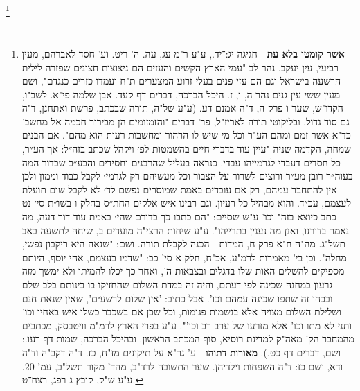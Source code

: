 \begin{multicols}{2}
\footnote{ \textbf{אשר קומטו בלא עת} - חגיגה יג:־יד., ע"ע ר"מ עג, עה. ה' ריט. וע' חסד לאברהם, מעין רביעי, עין יעקב, נהר לב "עמי הארץ הקשים והעזים הם ניצוצות חצונים שפזרה לילית הרשעה בישראל וגם הם עזי פנים בעלי זרוע המצערים ת"ח ועמדו כזרים כנגדם", ושם מעין ששי עין גנים נהר ה, ו, ז. היכל הברכה, דברים דף קעד. אבן שלמה פי"א. לשב"ו, הקדו"ש, שער ו פרק ה, ד"ה אמנם דע. \newline
(ע"ע של"ה, תורה שבכתב, פרשת ואתחנן, ד"ה גם סוד גדול. ובליקוטי תורה לאריז"ל, פר' דברים "והזמזומים הן מבירור חכמה אל מחשב' כד"א אשר זמם ומהם הע"ר וכל מי שיש לו הרהור ומחשבות רעות הוא מהם". אם הבנים שמחה, הקדמה שניה "עיין עוד בדברי חיים בהשמטות לפ׳ ויקהל שכתב בזה״ל: אך הע״ר, כל חסדים דעבדי לגרמייהו עבדי. כנראה בעליל שהרבנים וחסידים והבע״ב שבדור המה בעוה״ר רובן מע״ר ורוצים לשרור על הצבור וכל מעשיהם רק לגרמי׳ לקבל כבוד וממון ולכן אין להתחבר עמהם, רק אם עובדים באמת שמוסרים נפשם לד׳ לא לקבל שום תועלת לעצמם, עכ״ד. והוא מבהיל כל רעיון. וגם רבינו איש אלקים החת״ס בחלק ו בשו״ת סי׳ נט כתב כיוצא בזה" וכו' ע"ש שסיים: "הם כתבו כך בדורם שהי׳ באמת עוד דור דעה, מה נאמר בדורנו, ואנן מה נענין בתרייהו". ע"ע שיחות הרצי"ה מועדים ב, שיחה לתשעה באב תשל"ג. מה"ה ח"א פרק ח, המדות - הכנה לקבלת תורה. ושם: "שנאה היא ריקבון נפשי, מחלה". וכן בי' מאמרות לרמ"ע, אכ"ח, חלק א סי' כב: "שדמו בעצמם, אחי יוסף, היותם מספיקים להשלים האות שלו בדגלים ובצבאות ה', ואחר כך יכלו להמיתו ולא ימשך מזה גרעון במחנה שכינה לפי דעתם, והיה זה במדת השלום שהחזיקו בו בינותם בלב שלם ובכחו זה שתפו שכינה עמהם וכו'. אבל כתיב: 'אין שלום לרשעים', שאין שנאת חנם ושלילת השלום מצויה אלא בנשמות פגומות, וכל שכן אם בשכבר כשלו איש באחיו וכו' ותני לא מתו וכו' אלא מזרעו של ערב רב וכו'". ע"ע בפרי הארץ לרמ"מ וויטבסק, מכתבים מהמחבר הק' מאה"ק למדינת רוסיא, סוף המכתב הראשון. ובהיכל הברכה, שמות דף רעו.: ושם, דברים דף כט.).\newline
\textbf{מאורות }\textbf{דתוהו}\textbf{ }- ע' גר"א על תיקונים מז"ח, כז. ד"ה דקב"ה וד"ה ודא, ושם כז: ד"ה השפחות וילדיהן. שער התשובה לרד"ב, מהד' מקור תשל"ב, עמ' 20. ע"ע ש"ק, קובץ ג רפג, רצח־ט.}\צהגדרה{[ע"ר א פ־פא, מ"ר }\צהגדרה{]. }\\\\


\end{multicols}
